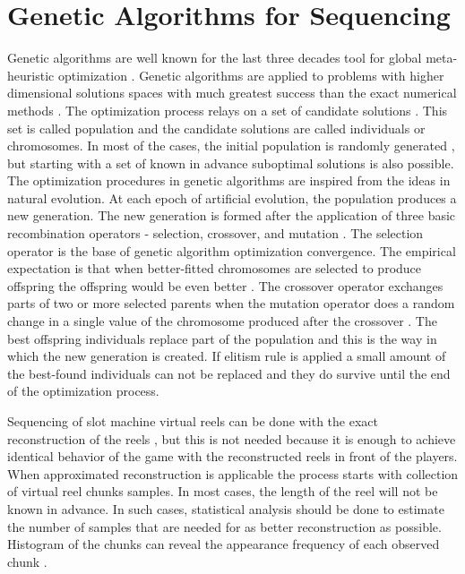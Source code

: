 \documentclass[11pt]{article}
\begin{document}
\section{Genetic Algorithms for Sequencing}

Genetic algorithms are well known for the last three decades tool for global meta-heuristic optimization \cite{Balabanov-Ivanov-Ketipov-2020}. Genetic algorithms are applied to problems with higher dimensional solutions spaces with much greatest success than the exact numerical methods \cite{Tomov-Zankinski-Balabanov-2019}. The optimization process relays on a set of candidate solutions \cite{Balabanov-Sevova-Kolev-2019}. This set is called population and the candidate solutions are called individuals or chromosomes. In most of the cases, the initial population is randomly generated \cite{Balabanov-Barova-Keremedchiev-2016}, but starting with a set of known in advance suboptimal solutions is also possible. The optimization procedures in genetic algorithms are inspired from the ideas in natural evolution. At each epoch of artificial evolution, the population produces a new generation. The new generation is formed after the application of three basic recombination operators - selection, crossover, and mutation \cite{Balabanov-Zankinski-Barova-2016}. The selection operator is the base of genetic algorithm optimization convergence. The empirical expectation is that when better-fitted chromosomes are selected to produce offspring the offspring would be even better \cite{Balabanov-Zankinski-Dobrinkova-2011}. The crossover operator exchanges parts of two or more selected parents when the mutation operator does a random change in a single value of the chromosome produced after the crossover \cite{Balabanov-Zankinski-Shumanov-2015}. The best offspring individuals replace part of the population and this is the way in which the new generation is created. If elitism rule is applied a small amount of the best-found individuals can not be replaced and they do survive until the end of the optimization process. 

Sequencing of slot machine virtual reels can be done with the exact reconstruction of the reels \cite{Tomov-Zankinski-Balabanov-2017-2}, but this is not needed because it is enough to achieve identical behavior of the game with the reconstructed reels in front of the players. When approximated reconstruction is applicable the process starts with collection of virtual reel chunks samples. In most cases, the length of the reel will not be known in advance. In such cases, statistical analysis should be done to estimate the number of samples that are needed for as better reconstruction as possible. Histogram of the chunks can reveal the appearance frequency of each observed chunk \cite{Balabanov-2020}.
\end{document}
